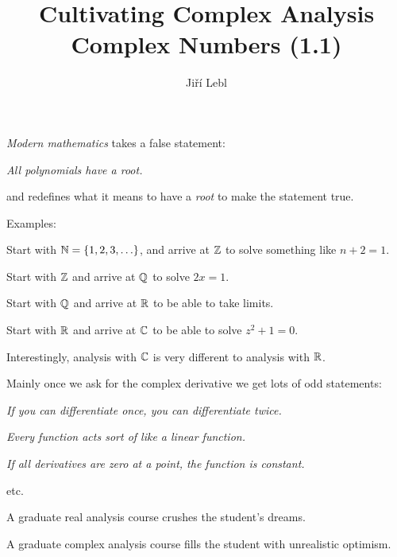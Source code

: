 \documentclass[10pt,aspectratio=169]{beamer}
\author{Ji\v{r}\'i Lebl}
\institute[OSU]{%
Departemento pri Matematiko de Oklahoma {\^S}tata Universitato}
\title{Cultivating Complex Analysis\\Complex Numbers (1.1)}
\date{}
\begin{document}
\begin{frame}
\titlepage
\end{frame}

\begin{frame}
\emph{Modern mathematics} takes a false statement:

\medskip

\emph{All polynomials have a root.}

\medskip
\pause

and redefines what it means to have a \emph{root}
to make the statement true.

\medskip
\pause

Examples:

Start with ${\mathbb{N}} = \{ 1,2,3,\ldots \}$,
and arrive at ${\mathbb{Z}}$ to solve something like $n+2=1$.

\medskip
\pause

Start with ${\mathbb{Z}}$ and arrive at ${\mathbb{Q}}$ to solve
$2x=1$.

\medskip
\pause

Start with ${\mathbb{Q}}$ and arrive at ${\mathbb{R}}$ to be able to take limits.

\medskip
\pause

Start with ${\mathbb{R}}$ and arrive at ${\mathbb{C}}$ to be able to solve $z^2+1=0$.
\end{frame}

\begin{frame}
Interestingly, analysis with ${\mathbb{C}}$ is very different to analysis with ${\mathbb{R}}$.

\medskip
\pause

Mainly once we ask for the complex derivative we get lots of odd statements:

\medskip

\emph{If you can differentiate once, you can differentiate twice.}

\pause
\emph{Every function acts sort of like a linear function.}

\pause
\emph{If all derivatives are zero at a point, the function is constant.}

\pause
etc.

\medskip
\pause

A graduate real analysis course crushes the student's dreams.

\medskip
\pause

A graduate complex analysis course fills the student with unrealistic
optimism.

\end{frame}
\end{document}
